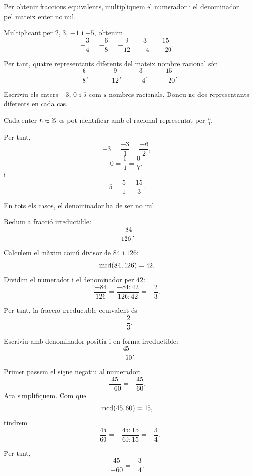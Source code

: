 \begin{solucio}
	Per obtenir fraccions equivalents, multipliquem el numerador i el denominador pel mateix enter no nul.

	Multiplicant per \(2\), \(3\), \(-1\) i \(-5\), obtenim
	\[
		-\frac{3}{4}
		=
		-\frac{6}{8}
		=
		-\frac{9}{12}
		=
		\frac{3}{-4}
		=
		\frac{15}{-20}.
	\]

	Per tant, quatre representants diferents del mateix nombre racional són
	\[
		-\frac{6}{8},\qquad
		-\frac{9}{12},\qquad
		\frac{3}{-4},\qquad
		\frac{15}{-20}.
	\]
\end{solucio}

\begin{exercici}
	Escriviu els enters \(-3\), \(0\) i \(5\) com a nombres racionals. Doneu-ne dos representants diferents en cada cas.
\end{exercici}

\begin{solucio}
	Cada enter \(n\in\mathbb{Z}\) es pot identificar amb el racional representat per \(\frac{n}{1}\).

	Per tant,
	\[
		-3=\frac{-3}{1}=\frac{-6}{2},
	\]
	\[
		0=\frac{0}{1}=\frac{0}{7},
	\]
	i
	\[
		5=\frac{5}{1}=\frac{15}{3}.
	\]

	En tots els casos, el denominador ha de ser no nul.
\end{solucio}

\begin{exercici}
	Reduïu a fracció irreductible:
	\[
		\frac{-84}{126}.
	\]
\end{exercici}

\begin{solucio}
	Calculem el màxim comú divisor de \(84\) i \(126\):
	\[
		\operatorname{mcd}(84,126)=42.
	\]
	Dividim el numerador i el denominador per \(42\):
	\[
		\frac{-84}{126}
		=
		\frac{-84:42}{126:42}
		=
		-\frac{2}{3}.
	\]

	Per tant, la fracció irreductible equivalent és
	\[
		-\frac{2}{3}.
	\]
\end{solucio}

\begin{exercici}
	Escriviu amb denominador positiu i en forma irreductible:
	\[
		\frac{45}{-60}.
	\]
\end{exercici}

\begin{solucio}
	Primer passem el signe negatiu al numerador:
	\[
		\frac{45}{-60}
		=
		-\frac{45}{60}.
	\]
	Ara simplifiquem. Com que
	\[
		\operatorname{mcd}(45,60)=15,
	\]
	tindrem
	\[
		-\frac{45}{60}
		=
		-\frac{45:15}{60:15}
		=
		-\frac{3}{4}.
	\]

	Per tant,
	\[
		\frac{45}{-60}
		=
		-\frac{3}{4}.
	\]
\end{solucio}

